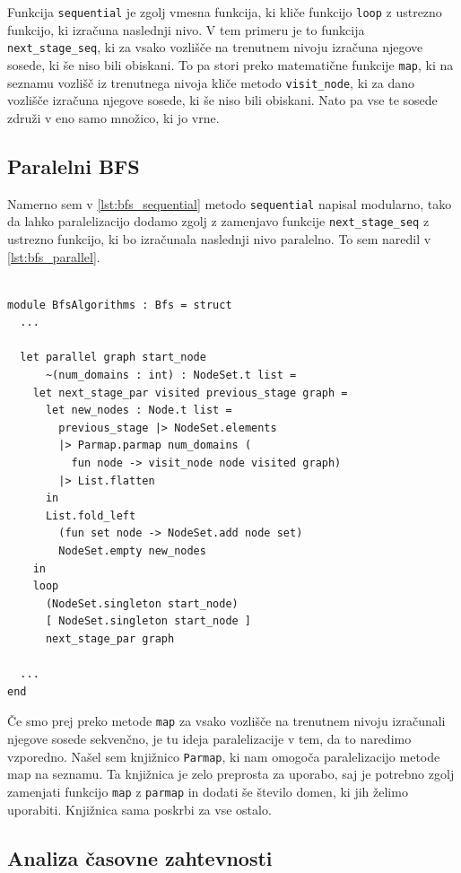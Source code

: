 \documentclass[mat1, tisk]{fmfdelo}
\begin{document}
Funkcija \texttt{sequential} je zgolj vmesna funkcija, ki kliče funkcijo \texttt{loop} z ustrezno funkcijo, ki
izračuna naslednji nivo. V tem primeru je to funkcija \texttt{next\_stage\_seq}, ki za vsako vozlišče na trenutnem
nivoju izračuna njegove sosede, ki še niso bili obiskani. To pa stori preko matematične funkcije \texttt{map}, ki
na seznamu vozlišč iz trenutnega nivoja kliče metodo \texttt{visit\_node}, ki za dano vozlišče izračuna njegove
sosede, ki še niso bili obiskani. Nato pa vse te sosede združi v eno samo množico, ki jo vrne.

\subsection{Paralelni BFS}

Namerno sem v \ref{lst:bfs_sequential} metodo \texttt{sequential} napisal modularno, tako da lahko paralelizacijo
dodamo zgolj z zamenjavo funkcije \texttt{next\_stage\_seq} z ustrezno funkcijo, ki bo izračunala naslednji nivo
paralelno. To sem naredil v \ref{lst:bfs_parallel}.

\begin{lstlisting}[label=lst:bfs_parallel]

module BfsAlgorithms : Bfs = struct
  ...

  let parallel graph start_node
      ~(num_domains : int) : NodeSet.t list =
    let next_stage_par visited previous_stage graph =
      let new_nodes : Node.t list =
        previous_stage |> NodeSet.elements
        |> Parmap.parmap num_domains (
          fun node -> visit_node node visited graph)
        |> List.flatten
      in
      List.fold_left
        (fun set node -> NodeSet.add node set)
        NodeSet.empty new_nodes
    in
    loop
      (NodeSet.singleton start_node)
      [ NodeSet.singleton start_node ]
      next_stage_par graph

  ...
end

\end{lstlisting}

Če smo prej preko metode \texttt{map} za vsako vozlišče na trenutnem nivoju izračunali njegove sosede sekvenčno,
je tu ideja paralelizacije v tem, da to naredimo vzporedno. Našel sem knjižnico \texttt{Parmap}, ki nam omogoča
paralelizacijo metode map na seznamu. Ta knjižnica je zelo preprosta za uporabo, saj je potrebno zgolj zamenjati
funkcijo \texttt{map} z \texttt{parmap} in dodati še število domen, ki jih želimo uporabiti. Knjižnica sama poskrbi
za vse ostalo.

\subsection{Analiza časovne zahtevnosti}
\end{document}
